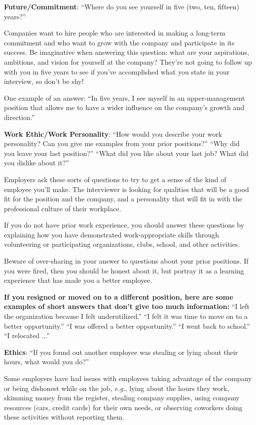 \textbf{Future/Commitment}: 
\break ``Where do you see yourself in five (two, ten, fifteen) years?''

Companies want to hire people who are interested in making a long-term commitment and who want to grow with the company and participate in its success. Be imaginative when answering this question: what are your aspirations, ambitions, and vision for yourself at the company? They're not going to follow up with you in five years to see if you've accomplished what you state in your interview, so don't be shy! 

One example of an answer:
\break ``In five years, I see myself in an upper-management position that allows me to have a wider influence on the company's growth and direction.''

\textbf{Work Ethic/Work Personality}: 
\break ``How would you describe your work personality? Can you give me examples from your prior positions?'' 
\break ``Why did you leave your last position?'' 
\break ``What did you like about your last job? What did you dislike about it?''

Employers ask these sorts of questions to try to get a sense of the kind of employee you'll make. The interviewer is looking for qualities that will be a good fit for the position and the company, and a personality that will fit in with the professional culture of their workplace.

If you do not have prior work experience, you should answer these questions by explaining how you have demonstrated work-appropriate skills through volunteering or participating organizations, clubs, school, and other activities.

Beware of over-sharing in your answer to questions about your prior positions. If you were fired, then you should be honest about it, but portray it as a learning experience that has made you a better employee.

\textbf{If you resigned or moved on to a different position, here are some examples of short answers that don't give too much information:}
\break ``I left the organization because I felt underutilized.''
\break ``I felt it was time to move on to a better opportunity.'' 
\break ``I was offered a better opportunity.''
\break ``I went back to school.'' 
\break ``I relocated ...''

\textbf{Ethics}: ``If you found out another employee was stealing or lying about their hours, what would you do?''

Some employers have had issues with employees taking advantage of the company or being dishonest while on the job, \textit{e.g.}, lying about the hours they work, skimming money from the register, stealing company supplies, using company resources (cars, credit cards) for their own needs, or observing coworkers doing these activities without reporting them.

